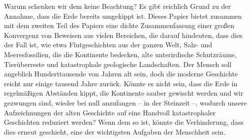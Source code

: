 \documentclass[10pt,twocolumn,letterpaper]{article}
\begin{document}
Warum schenken wir dem keine Beachtung? Es gibt reichlich Grund zu der Annahme, dass die Erde bereits umgekippt ist. Dieses Papier bietet zusammen mit dem zweiten Teil des Papiers eine dichte Zusammenfassung einer großen Konvergenz von Beweisen aus vielen Bereichen, die darauf hindeuten, dass dies der Fall ist, wie etwa Flutgeschichten aus der ganzen Welt, Salz- und Meeresfossilien, die die Kontinente bedecken, alte unterirdische Schutzräume, Tierüberreste und katastrophale geologische Landschaften. Der Mensch soll angeblich Hunderttausende von Jahren alt sein, doch die moderne Geschichte reicht nur einige tausend Jahre zurück. Könnte es nicht sein, dass die Erde in regelmäßigen Abständen kippt, die Kontinente sauber gewischt werden und wir gezwungen sind, wieder bei null anzufangen – in der Steinzeit –, wodurch unsere Aufzeichnungen der alten Geschichte auf eine Handvoll katastrophaler Geschichten reduziert werden? Wenn dem so ist, könnte die Verhinderung, dass dies erneut geschieht, eine der wichtigsten Aufgaben der Menschheit sein.
\end{document}
